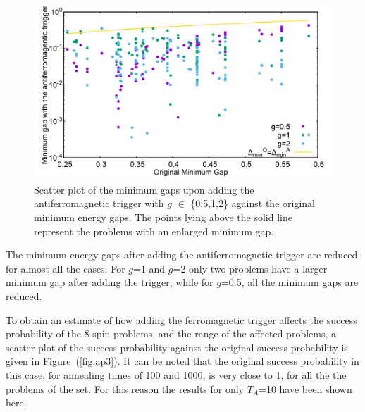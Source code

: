 \documentclass[../main.tex]{subfiles}
\begin{document}
\begin{appendices}
\begin{figure}[H]
\centering 
\includegraphics[scale=0.2]{Mingap_A_8.png}
\caption{Scatter plot of the minimum gaps upon adding the antiferromagnetic trigger with $g$ $\in$ \{0.5,1,2\} against the original minimum energy gaps. The points lying above the solid line represent the problems with an enlarged minimum gap.}
\label{fig:ap2}
\end{figure}
The minimum energy gaps after adding the antiferromagnetic trigger are reduced for almost all the cases. For $g$=1 and $g$=2 only two problems have a larger minimum gap after adding the trigger, while for $g$=0.5, all the minimum gaps are reduced.

To obtain an estimate of how adding the ferromagnetic trigger affects the success probability of the 8-spin problems, and the range of the affected problems, a scatter plot of the success probability against the original success probability is given in Figure~(\ref{fig:ap3}). It can be noted that the original success probability in this case, for annealing times of 100 and 1000, is very close to 1, for all the the problems of the set. For this reason the results for only $T_A$=10 have been shown here.


\end{appendices}
\end{document}
